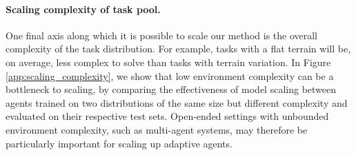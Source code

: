 \documentclass[11pt, a4paper, logo, copyright]{deepmind}
\begin{document}
\paragraph{Scaling complexity of task pool.}
One final axis along which it is possible to scale our method is the overall complexity of the task distribution. For example, tasks with a flat terrain will be, on average, less complex to solve than tasks with terrain variation. In Figure \ref{app:scaling_complexity}, we show that low environment complexity can be a bottleneck to scaling, by comparing the effectiveness of model scaling between agents trained on two distributions of the same size but different complexity and evaluated on their respective test sets. Open-ended settings with unbounded environment complexity, such as multi-agent systems, may therefore be particularly important for scaling up adaptive agents.
\end{document}
